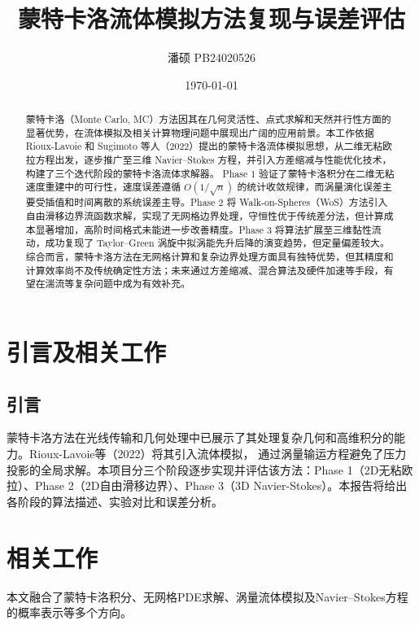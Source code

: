 \documentclass[UTF8,fontset=fandol]{ctexart}
\title{\bfseries 蒙特卡洛流体模拟方法复现与误差评估}
\author{潘硕 PB24020526}
\date{\today}
\begin{document}
\maketitle

\begin{abstract}
蒙特卡洛（Monte Carlo, MC）方法因其在几何灵活性、点式求解和天然并行性方面的显著优势，在流体模拟及相关计算物理问题中展现出广阔的应用前景。本工作依据 Rioux-Lavoie 和 Sugimoto 等人（2022）提出的蒙特卡洛流体模拟思想，从二维无粘欧拉方程出发，逐步推广至三维 Navier--Stokes 方程，并引入方差缩减与性能优化技术，构建了三个迭代阶段的蒙特卡洛流体求解器。
Phase 1 验证了蒙特卡洛积分在二维无粘速度重建中的可行性，速度误差遵循 $O(1/\sqrt{n})$ 的统计收敛规律，而涡量演化误差主要受插值和时间离散的系统误差主导。Phase 2 将 Walk-on-Spheres（WoS）方法引入自由滑移边界流函数求解，实现了无网格边界处理，守恒性优于传统差分法，但计算成本显著增加，高阶时间格式未能进一步改善精度。Phase 3 将算法扩展至三维黏性流动，成功复现了 Taylor--Green 涡旋中拟涡能先升后降的演变趋势，但定量偏差较大。
综合而言，蒙特卡洛方法在无网格计算和复杂边界处理方面具有独特优势，但其精度和计算效率尚不及传统确定性方法；未来通过方差缩减、混合算法及硬件加速等手段，有望在湍流等复杂问题中成为有效补充。
\end{abstract}

\section{引言及相关工作}

\subsection{引言}
蒙特卡洛方法在光线传输和几何处理中已展示了其处理复杂几何和高维积分的能力。Rioux-Lavoie等（2022）将其引入流体模拟，
通过涡量输运方程避免了压力投影的全局求解。本项目分三个阶段逐步实现并评估该方法：Phase 1（2D无粘欧拉）、Phase 2（2D自由滑移边界）、Phase 3（3D Navier-Stokes）。本报告将给出各阶段的算法描述、实验对比和误差分析。
\section{相关工作}

本文融合了蒙特卡洛积分、无网格PDE求解、涡量流体模拟及Navier–Stokes方程的概率表示等多个方向。
\end{document}
